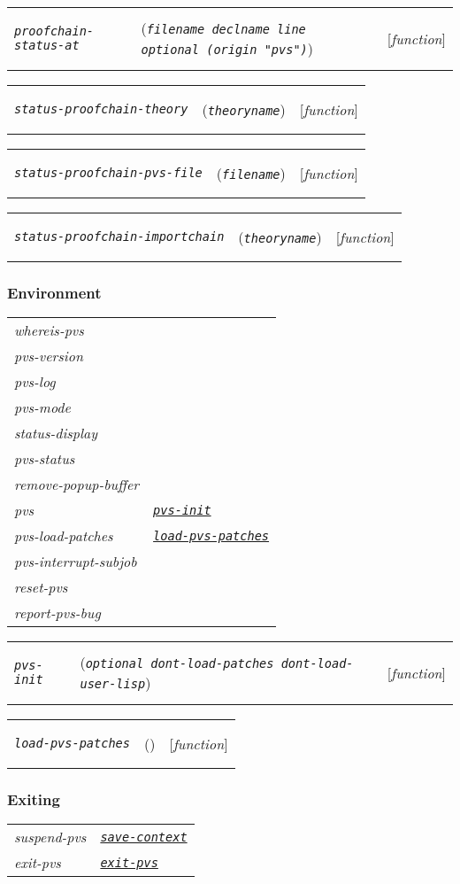 \documentclass[12pt]{book}
\makeatletter
\def\ampoptional{{\smaller\sc {\smaller\smaller \&}optional\ }}
\newenvironment{function}[3]%
{\par\noindent\begin{boxedminipage}{\textwidth}%
 \par\noindent\begin{tabularx}{\linewidth}{l>{\raggedright}Xr}%
 \functionhtgt{#1}&(\texttt{\textit{#2}})&[\emph{#3}]%
 \end{tabularx}\par\flushright\begin{minipage}{.97\textwidth}}
{\end{minipage}\end{boxedminipage}}
\newcommand{\functionnm}[1]{\texttt{\textit{#1}}}
\newcommand{\functionhln}[1]{\hyperlink{#1}{\functionnm{#1}}}
\newcommand{\functionhtgt}[1]{\hypertarget{#1}{\functionnm{#1}}\index{#1@\functionnm{#1}|underline}}
\newenvironment{lispfunction}[2]%
{\begin{function}{#1}{#2}{function}}{\end{function}}
\makeatother
\begin{document}
\begin{lispfunction}{proofchain-status-at}
  {filename declname line \ampoptional \textup{(}origin \textup{"pvs"}\textup{)}}
\end{lispfunction}

\begin{lispfunction}{status-proofchain-theory}{theoryname}
\end{lispfunction}

\begin{lispfunction}{status-proofchain-pvs-file}{filename}
\end{lispfunction}

\begin{lispfunction}{status-proofchain-importchain}{theoryname}
\end{lispfunction}


\subsubsection{Environment}
\noindent\begin{tabularx}{\linewidth}{|>{\itshape\ttfamily}l|>{\raggedright\arraybackslash}X|}\hline
  whereis-pvs & \\
  pvs-version & \\
  pvs-log & \\
  pvs-mode & \\
  status-display & \\
  pvs-status & \\
  remove-popup-buffer & \\
  pvs & \functionhln{pvs-init} \\
  pvs-load-patches & \functionhln{load-pvs-patches} \\
  pvs-interrupt-subjob & \\
  reset-pvs & \\ \hline
  report-pvs-bug & \\ \hline
\end{tabularx}

\begin{lispfunction}{pvs-init}
  {\ampoptional dont-load-patches dont-load-user-lisp}
\end{lispfunction}

\begin{lispfunction}{load-pvs-patches}{}
\end{lispfunction}


\subsubsection{Exiting}
\noindent\begin{tabularx}{\linewidth}{|>{\itshape\ttfamily}l|>{\raggedright\arraybackslash}X|}\hline
  suspend-pvs & \functionhln{save-context} \\
  exit-pvs & \functionhln{exit-pvs} \\ \hline
\end{tabularx}
\end{document}
